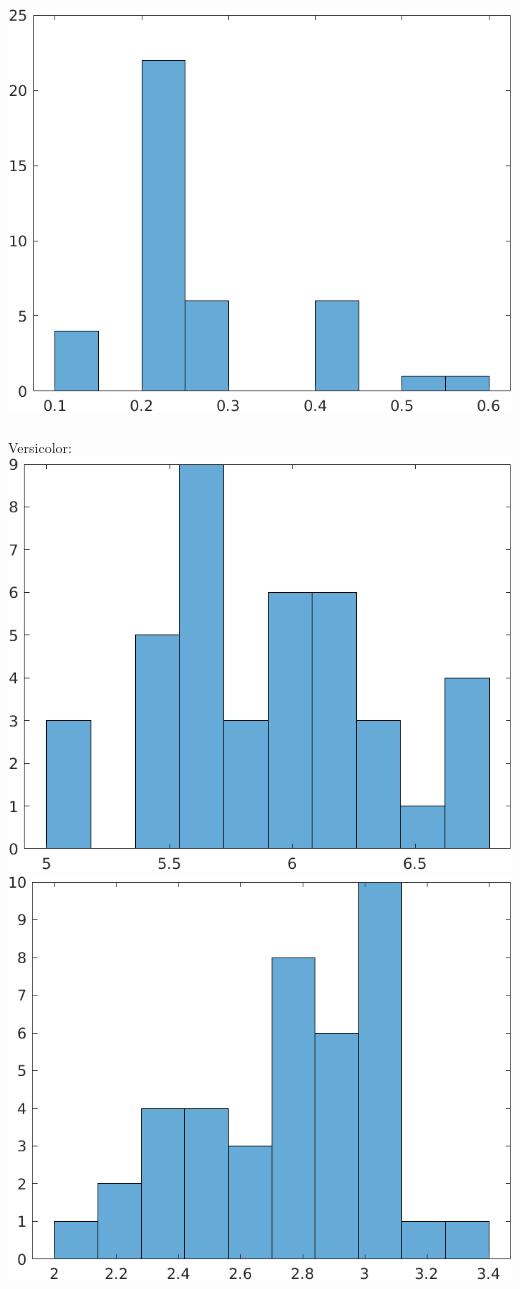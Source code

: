 \documentclass[a4paper]{scrartcl}
\begin{document}
\begin{itemize}
		\includegraphics*[scale=0.2]{assignment2_data/plots/setosa_bp.png}\\ \ \\
		Versicolor:\\
		\includegraphics*[scale=0.2]{assignment2_data/plots/versicolor_sl.png}
		\includegraphics*[scale=0.2]{assignment2_data/plots/versicolor_sb.png}

\end{itemize}
\end{document}
